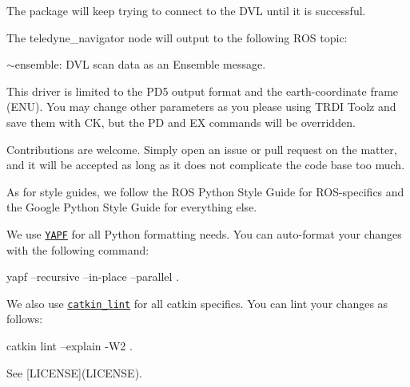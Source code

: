 The package will keep trying to connect to the D\+VL until it is successful.

The {\ttfamily teledyne\+\_\+navigator} node will output to the following R\+OS topic\+:


\begin{DoxyItemize}
\item {\ttfamily $\sim$ensemble}\+: D\+VL scan data as an {\ttfamily Ensemble} message.
\end{DoxyItemize}

This driver is limited to the P\+D5 output format and the earth-\/coordinate frame (E\+NU). You may change other parameters as you please using T\+R\+DI Toolz and save them with {\ttfamily CK}, but the {\ttfamily PD} and {\ttfamily EX} commands will be overridden.

Contributions are welcome. Simply open an issue or pull request on the matter, and it will be accepted as long as it does not complicate the code base too much.

As for style guides, we follow the R\+OS Python Style Guide for R\+O\+S-\/specifics and the Google Python Style Guide for everything else.

We use \href{https://github.com/google/yapf}{\tt Y\+A\+PF} for all Python formatting needs. You can auto-\/format your changes with the following command\+:


\begin{DoxyCode}
yapf --recursive --in-place --parallel .
\end{DoxyCode}


We also use \href{https://github.com/fkie/catkin_lint}{\tt catkin\+\_\+lint} for all {\ttfamily catkin} specifics. You can lint your changes as follows\+:


\begin{DoxyCode}
catkin lint --explain -W2 .
\end{DoxyCode}


See \mbox{[}L\+I\+C\+E\+N\+SE\mbox{]}(L\+I\+C\+E\+N\+SE). 